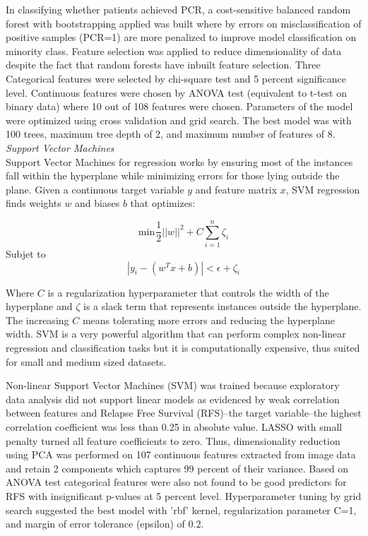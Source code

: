 \documentclass{article}
\begin{document}
In classifying whether patients achieved PCR, a cost-sensitive balanced random forest with bootstrapping applied was built where by errors on misclassification of positive samples (PCR=1) are more penalized to improve model classification on minority class. Feature selection was applied to reduce dimensionality of data despite the fact that random forests have inbuilt feature selection. Three Categorical features were selected by chi-square test and  5 percent significance level. Continuous features were chosen by ANOVA test (equivalent to t-test on binary data) where 10 out of 108 features were chosen. Parameters of the model were optimized using cross validation and grid search. The best model was with 100 trees, maximum tree depth of 2, and maximum number of features of 8. \\

\noindent\textit{Support Vector Machines}\\
Support Vector Machines for regression works by ensuring most of the instances fall within the hyperplane while minimizing errors for those lying outside the plane. Given a continuous target variable $y$ and feature matrix $x$, SVM regression finds weights $w$ and biases $b$ that optimizes:

\begin{equation}
	\label{eq:svm}
	\text{min}\hspace{1pt}  \frac{1}{2}||w||^{2} +C\sum_{i=1}^{n}\zeta_i
\end{equation}
Subjet to 
\begin{equation*}
	|y_i - (w^{T}x + b)|< \epsilon + \zeta_i
\end{equation*}

Where $C$ is a regularization hyperparameter that controls the width of the hyperplane and $\zeta$ is a slack term that represents instances outside the hyperplane. The increasing $C$ means tolerating more errors and reducing the hyperplane width. SVM is a very powerful algorithm that can perform complex non-linear regression and classification tasks but it is computationally expensive, thus suited for small and medium sized datasets.

Non-linear Support Vector Machines (SVM) was trained because exploratory data analysis did not support linear models as evidenced by weak correlation between features and Relapse Free Survival (RFS)--the target variable--the highest correlation coefficient was less than 0.25 in absolute value. LASSO with small penalty turned all feature coefficients to zero. Thus, dimensionality reduction using PCA was performed on 107 continuous features extracted from image data and retain 2 components which captures 99 percent of their variance. Based on ANOVA test categorical features were also not found to be good predictors for RFS with insignificant p-values at 5 percent level. Hyperparameter tuning by grid search suggested the best model with 'rbf' kernel, regularization parameter C=1, and margin of error tolerance (epsilon) of 0.2.
\end{document}
